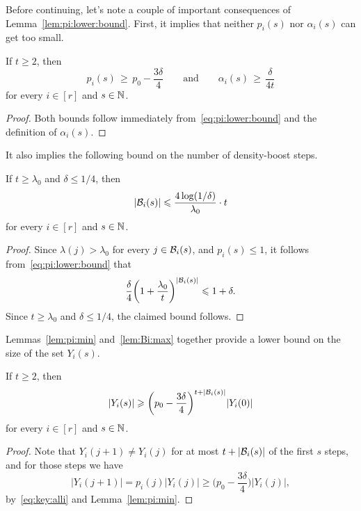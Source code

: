 Before continuing, let's note a couple of important consequences of Lemma~\ref{lem:pi:lower:bound}. First, it implies that neither $p_i(s)$ nor $\alpha_i(s)$ can get too small. 

\begin{lemma}\label{lem:pi:min} 
  If\/ $t \ge 2$, then 
  $$p_i(s) \, \ge \, p_0 - \frac{3\delta}{4} \qquad \text{and} \qquad \alpha_i(s) \, \ge \, \frac{\delta}{4t}$$
  for every $i \in [r]$ and $s \in \mathbb{N}$. 
\end{lemma}

\begin{proof}
  Both bounds follow immediately from~\eqref{eq:pi:lower:bound} and the definition of $\alpha_i(s)$. 
\end{proof}
  
It also implies the following bound on the number of density-boost steps. 

\begin{lemma}\label{lem:Bi:max}
  If\/ $t \ge \lambda_0$ and\/ $\delta \le 1/4$, then
  $$|\mathcal{B}_i(s)| \leqslant \frac{4 \log(1/\delta)}{\lambda_0} \cdot t$$
  for every $i \in [r]$ and $s \in \mathbb{N}$. 
\end{lemma}
  
\begin{proof}
  Since $\lambda(j) > \lambda_0$ for every $j \in \mathcal{B}_i(s)$, and $p_i(s) \le 1$, it follows from~\eqref{eq:pi:lower:bound} that
  $$\frac{\delta}{4} \bigg( 1 + \frac{\lambda_0}{t} \bigg)^{|\mathcal{B}_i(s)|} \leqslant 1 + \delta.$$
  Since $t \ge \lambda_0$ and $\delta \le 1/4$, the claimed bound follows. 
\end{proof}

Lemmas~\ref{lem:pi:min} and~\ref{lem:Bi:max} together provide a lower bound on the size of the set $Y_i(s)$. 

\begin{lemma}\label{lem:Y:lower:bound}
  If\/ $t \ge 2$, then
  $$|Y_i(s)| \geqslant \bigg( p_0 - \frac{3\delta}{4} \bigg)^{t + |\mathcal{B}_i(s)|} |Y_i(0)|$$
  for every $i \in [r]$ and $s \in \mathbb{N}$. 
\end{lemma}
  
\begin{proof}
  Note that $Y_i(j+1) \ne Y_i(j)$ for at most $t + |\mathcal{B}_i(s)|$ of the first $s$ steps, and for those steps we have
  $$|Y_i(j+1)| = p_i(j) |Y_i(j)| \ge \bigg( p_0 - \frac{3\delta}{4} \bigg) |Y_i(j)|,$$ 
  by~\eqref{eq:key:alli} and Lemma~\ref{lem:pi:min}.
\end{proof}


